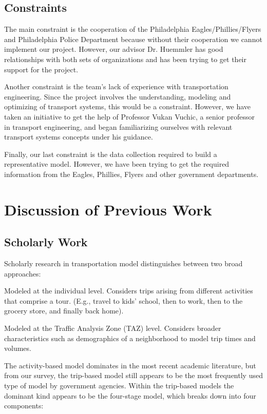 \documentclass[12pt]{article}
\begin{document}
\subsection{Constraints}
The main constraint is the cooperation of the Philadelphia
Eagles/Phillies/Flyers and Philadelphia Police Department because without
their cooperation we cannot implement our project. However, our
advisor Dr. Huemmler has good relationships with both sets of organizations
and has been trying to get their support for the project.

Another constraint is the team’s lack of experience with
transportation engineering.  Since the project involves the
understanding, modeling and optimizing of transport systems, this
would be a constraint. However, we have taken an initiative to get the
help of Professor Vukan Vuchic, a senior professor in transport
engineering, and began familiarizing ourselves with relevant transport
systems concepts under his guidance.

Finally, our last constraint is the data collection required to build
a representative model. However, we have been trying to get the
required information from the Eagles, Phillies, Flyers and other government
departments.

\section{Discussion of Previous Work}
\subsection{Scholarly Work}
Scholarly research in transportation model distinguishes between two
broad approaches: \cite{kitamura1988}

\begin{description}[style=nextline]
    \item[Activity-based] Modeled at the individual level. Considers
  trips arising from different activities that comprise a tour. (E.g.,
  travel to kids' school, then to work, then to the grocery store, and
  finally back home). \cite{kitamura1988}
    \item[Trip-based] Modeled at the Traffic Analysis Zone (TAZ)
  level. Considers broader characteristics such as demographics of a
  neighborhood to model trip times and volumes.\cite{murthy01}
\end{description}

The activity-based model dominates in the most recent academic
literature, but from our survey, the trip-based model still appears to
be the most frequently used type of model by government
agencies. Within the trip-based models the dominant kind appears to be
the four-stage model, which breaks down into four components:
\cite{murthy01}
\end{document}
